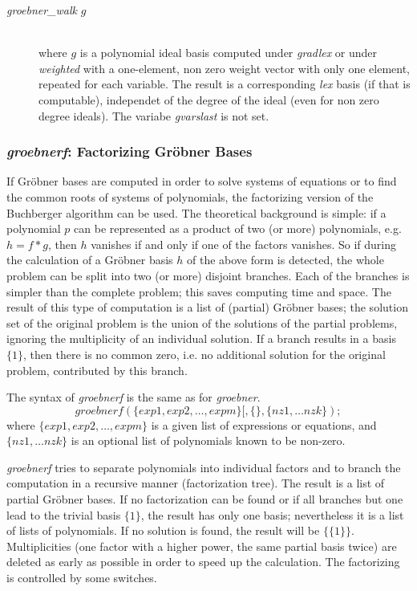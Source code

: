 \begin{description}
\item[{\it groebner\_walk} $g$]\mbox{}\\
where $g$ is a polynomial ideal basis computed under \emph{gradlex} or under
\emph{weighted} with a one-element, non zero weight vector with only one
element, repeated for each variable. The result is a corresponding
\emph{lex} basis (if that is computable), independet of the degree of the
ideal (even for non zero degree ideals).
The variabe \emph{gvarslast} is not set.
\end{description}

\subsubsection{\emph{groebnerf}: Factorizing Gr\"obner Bases}

If Gr\"obner bases are computed in order to solve systems of
equations or to find the common roots of systems of polynomials,
the factorizing version of the Buchberger algorithm can be used.
The theoretical background is simple: if a polynomial $p$ can be
represented as a product of two (or more) polynomials, e.g. $h= f*g$,
then $h$ vanishes if and only if one of the factors vanishes. So if
during the calculation of a Gr\"obner basis $h$ of the above form is
detected, the whole problem can be split into two (or more)
disjoint branches. Each of the branches is simpler than the complete
problem; this saves computing time and space. The result of this
type of computation is a list of (partial) Gr\"obner bases; the
solution set of the original problem is the union of the solutions of
the partial problems, ignoring the multiplicity of an individual
solution. If a branch results in a basis $\{1\}$, then there is no
common zero, i.e. no additional solution for the original problem,
contributed by this branch.


The syntax of \emph{groebnerf} is the same as for \emph{groebner}.
\[ \textit{groebnerf}(\{exp1, exp2, \ldots , expm\}
         [,\{\},\{nz1, \ldots nzk\}); \]
where $\{exp1, exp2, \ldots , expm\} $ is a given list of expressions or
equations, and $\{nz1, \ldots nzk\}$ is
an optional list of polynomials known to be non-zero.

\emph{groebnerf} tries to separate polynomials into individual factors and
to branch the computation in a recursive manner (factorization tree).
The result is a list of partial Gr\"obner bases. If no factorization can
be found or if all branches but one lead to the trivial basis $\{1\}$,
the result has only one basis; nevertheless it is a list of lists of
polynomials. If no solution is found, the result will be $\{\{1\}\}$.
Multiplicities (one factor with a higher power, the same partial basis
twice) are deleted as early as possible in order to speed up the
calculation. The factorizing is controlled by some switches.

